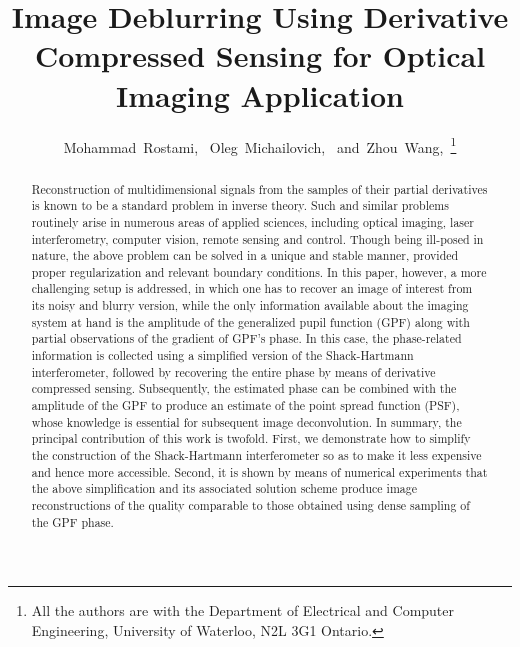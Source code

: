 \pdfoutput=1 \documentclass[journal]{IEEEtran}
\begin{document}
\title{Image Deblurring Using Derivative Compressed Sensing for Optical Imaging Application}

\author{Mohammad~Rostami,~
        Oleg~Michailovich,~
        and~Zhou~Wang,~\thanks{All the authors are with the Department of Electrical and Computer Engineering, University of Waterloo, N2L 3G1 Ontario.}}


\maketitle

\begin{abstract}
Reconstruction of multidimensional signals from the samples of their partial derivatives is known to be a standard problem in inverse theory. Such and similar problems routinely arise in numerous areas of applied sciences, including optical imaging, laser interferometry, computer vision, remote sensing and control. Though being ill-posed in nature, the above problem can be solved in a unique and stable manner, provided proper regularization and relevant boundary conditions. In this paper, however, a more challenging setup is addressed, in which one has to recover an image of interest from its noisy and blurry version, while the only information available about the imaging system at hand is the amplitude of the generalized pupil function (GPF) along with partial observations of the gradient of GPF's phase. In this case, the phase-related information is collected using a simplified version of the Shack-Hartmann interferometer, followed by recovering the entire phase by means of derivative compressed sensing. Subsequently, the estimated phase can be combined with the amplitude of the GPF to produce an estimate of the point spread function (PSF), whose knowledge is essential for subsequent image deconvolution. In summary, the principal contribution of this work is twofold. First, we demonstrate how to simplify the construction of the Shack-Hartmann interferometer so as to make it less expensive and hence more accessible. Second, it is shown by means of numerical experiments that the above simplification and its associated solution scheme produce image reconstructions of the quality comparable to those obtained using dense sampling of the GPF phase.
\end{abstract}
\end{document}

